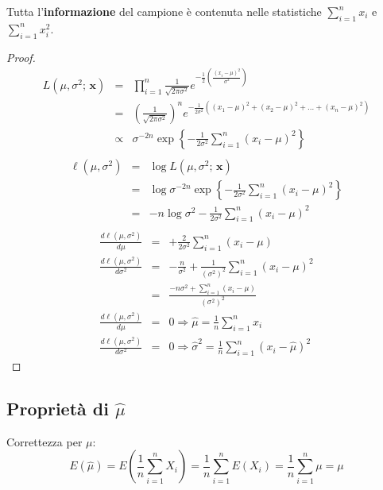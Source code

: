 \documentclass[
  11pt,
]{book}
\theoremstyle{mytheoremstyle}
\theoremstyle{mydefstyle}
\begin{document}
Tutta l'\textbf{informazione} del campione è contenuta nelle statistiche \(\sum_{i=1}^n x_i\)
e \(\sum_{i=1}^n x_i^2\).

\begin{proof}
\begin{eqnarray*}
  L(\mu,\sigma^2;\,\mathbf{x}) &=&  \prod_{i=1}^n \frac{1}{\sqrt{2\pi\sigma^2}}e^
  {-\frac 12\left(\frac{(x_i-\mu)^2}{\sigma^2}\right)}\\
  &=&\left(\frac{1}{\sqrt{2\pi\sigma^2}}\right)^n 
  e^{-\frac 1{2\sigma^2}((x_1-\mu)^2+(x_2-\mu)^2+...+(x_n-\mu)^2)}\\
  &\propto& \sigma^{-2n}\exp\left\{-\frac 1{2\sigma^2}\sum_{i=1}^n(x_i-\mu)^2\right\}\\
\end{eqnarray*}
\begin{eqnarray*}  
  \ell(\mu,\sigma^2) &=& \log L(\mu,\sigma^2;\,\mathbf{x})\\
  &=& \log \sigma^{-2n}\exp\left\{-\frac 1{2\sigma^2}\sum_{i=1}^n(x_i-\mu)^2\right\}\\
  &=& -n \log \sigma^2-\frac 1{2\sigma^2}\sum_{i=1}^n(x_i-\mu)^2\\
\end{eqnarray*}
\begin{eqnarray*}  
  \frac{d\ell(\mu,\sigma^2)}{d\mu} &=& +\frac 2{2\sigma^2}\sum_{i=1}^n(x_i-\mu)\\
  \frac{d\ell(\mu,\sigma^2)}{d\sigma^2} &=& -\frac n{\sigma^2}+\frac 1{(\sigma^2)^2}\sum_{i=1}^n(x_i-\mu)^2\\
  &=& \frac{-n\sigma^2+\sum_{i=1}^n(x_i-\mu)}{(\sigma^2)^2}\\
  \frac{d\ell(\mu,\sigma^2)}{d\mu} &=& 0 \Rightarrow \hat\mu=\frac 1n \sum_{i=1}^nx_i\\
  \frac{d\ell(\mu,\sigma^2)}{d\sigma^2} &=& 0 \Rightarrow \hat\sigma^2=\frac 1 n \sum_{i=1}^n(x_i-\hat\mu)^2
\end{eqnarray*}
\end{proof}

\subsection{\texorpdfstring{Proprietà di \(\hat\mu\)}{Proprietà di \textbackslash hat\textbackslash mu}}\label{proprietuxe0-di-hatmu}

\begin{info}
Correttezza per \(\mu\):
\[
  E(\hat\mu) =  E\left(\frac{1}n\sum_{i=1}^n X_i\right) = \frac 1 n \sum_{i=1}^n E(X_i) = \frac 1 n \sum_{i=1}^n \mu = \mu
\]

\end{info}
\end{document}

